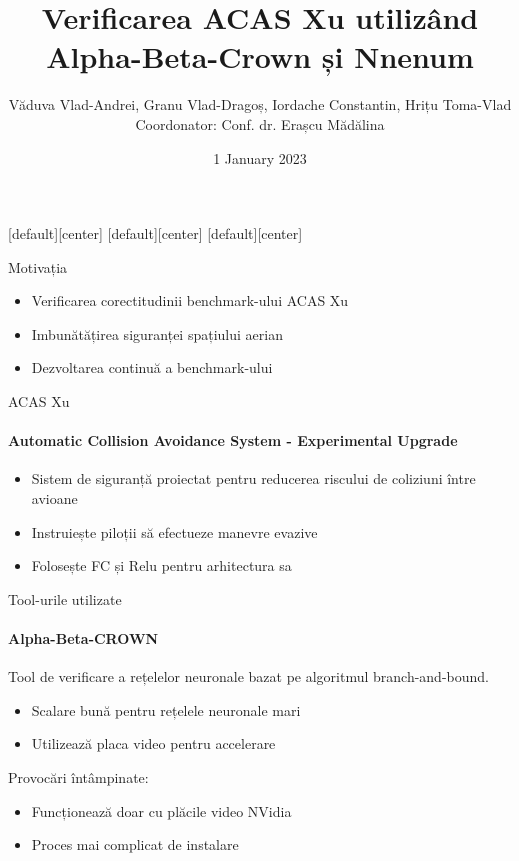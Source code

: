 \documentclass[aspectratio=169]{beamer}
\title{Verificarea ACAS Xu utilizând Alpha-Beta-Crown și Nnenum}
\author{Văduva Vlad-Andrei, Granu Vlad-Dragoș, Iordache Constantin, Hrițu Toma-Vlad
\small Coordonator: Conf. dr. Erașcu Mădălina}
\institute[rtk]{Universitatea de Vest din Timișoara}
\date{1 January 2023}
\begin{document}
  \settitlepagestyle
  
  
  [default][center]
  [default][center]
  [default][center]
  
	\maketitle

  \begin{frame}{Motivația}
    \begin{itemize}
      \item Verificarea corectitudinii benchmark-ului ACAS Xu 
      \newline
      \item Imbunătățirea siguranței spațiului aerian
      \newline
      \item Dezvoltarea continuă a benchmark-ului
      \newline
    \end{itemize}
  \end{frame}
  
  \begin{frame}{ACAS Xu}
        \framesubtitle{Automatic Collision Avoidance System - Experimental Upgrade}
  	\begin{itemize}
  		\item Sistem de siguranță proiectat pentru reducerea riscului de coliziuni între avioane
    \newline
  		\item Instruiește piloții să efectueze manevre evazive
    \newline
  		\item Folosește FC și Relu pentru arhitectura sa
    \newline
  	\end{itemize}
  \end{frame}

  \begin{frame}{Tool-urile utilizate}
      \framesubtitle{Alpha-Beta-CROWN}
      Tool de verificare a rețelelor neuronale bazat pe algoritmul branch-and-bound. \newline
      \begin{itemize}
          \item Scalare bună pentru rețelele neuronale mari
          \newline
          \item Utilizează placa video pentru accelerare
          \newline
        \end{itemize}
        Provocări întâmpinate:\newline
        \begin{itemize}
          \item Funcționează doar cu plăcile video NVidia \newline
          \item Proces mai complicat de instalare
      \end{itemize}
  \end{frame}
\end{document}
